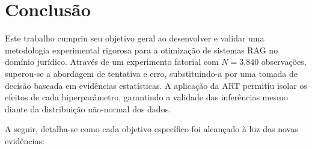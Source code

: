 \section{Conclusão}

Este trabalho cumpriu seu objetivo geral ao desenvolver e validar uma metodologia experimental rigorosa para a otimização de sistemas RAG no domínio jurídico. Através de um experimento fatorial com $N = 3.840$ observações, superou-se a abordagem de tentativa e erro, substituindo-a por uma tomada de decisão baseada em evidências estatísticas. A aplicação da ART permitiu isolar os efeitos de cada hiperparâmetro, garantindo a validade das inferências mesmo diante da distribuição não-normal dos dados.

A seguir, detalha-se como cada objetivo específico foi alcançado à luz das novas evidências:



